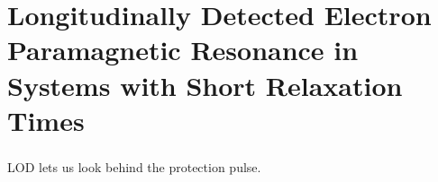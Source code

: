 \chapter{Longitudinally Detected Electron Paramagnetic Resonance in Systems with Short Relaxation Times}

\paragraph*{}
LOD lets us look behind the protection pulse.




